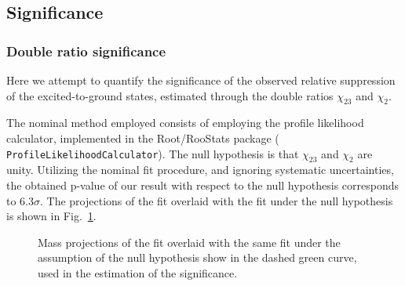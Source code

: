 \subsection{Significance} %
\label{sec:signficance}

\subsubsection{Double ratio significance}

Here we attempt to quantify the significance of the observed relative
suppression of the excited-to-ground states, estimated through the
double ratios $\chi_{23}$ and $\chi_{2}$.

The nominal method employed consists of employing the profile
likelihood calculator, implemented in the Root/RooStats package ({\tt
ProfileLikelihoodCalculator}).  The null hypothesis is that
$\chi_{23}$ and $\chi_2$ are unity.  Utilizing the nominal fit
procedure, and ignoring systematic uncertainties, the obtained p-value
of our result with respect to the null hypothesis corresponds to $6.3
\sigma$.  The projections of the fit overlaid with the fit under the 
null hypothesis is shown in Fig.~\ref{fig:statSignifPlot}.

\begin{figure}
\begin{center}
\caption{Mass projections of the fit overlaid with the same fit under the assumption of the null hypothesis show in the dashed green curve, used in the estimation of the significance.}
\label{fig:statSignifPlot}
\end{center}
\end{figure}

